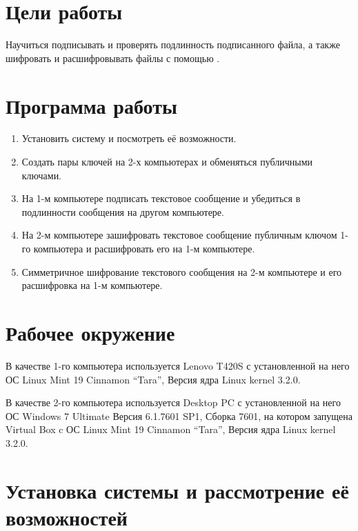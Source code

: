 





\tableofcontents
\lstlistoflistings
\newpage

\section{Цели работы}

Научиться подписывать и проверять подлинность подписанного файла, а также шифровать и расшифровывать файлы с помощью .

\section{Программа работы}

\begin{enumerate}
	\item Установить  систему и посмотреть её возможности.
	\item Создать пары  ключей на 2-х компьютерах и обменяться публичными ключами.
	\item На 1-м компьютере подписать текстовое сообщение и убедиться в подлинности сообщения на другом компьютере.
	\item На 2-м компьютере зашифровать текстовое сообщение публичным ключом 1-го компьютера и расшифровать его на 1-м компьютере.
	\item Симметричное шифрование текстового сообщения на 2-м компьютере и его расшифровка на 1-м компьютере.
\end{enumerate}

\section{Рабочее окружение}

В качестве 1-го компьютера используется Lenovo T420S с установленной на него ОС Linux Mint 19 Cinnamon “Tara”, Версия ядра Linux kernel 3.2.0.

В качестве 2-го компьютера используется Desktop PC с установленной на него ОС Windows 7 Ultimate Версия 6.1.7601 SP1, Сборка 7601, на котором запущена Virtual Box c ОС Linux Mint 19 Cinnamon “Tara”, Версия ядра Linux kernel 3.2.0.

\section{Установка  системы  и рассмотрение её возможностей}

